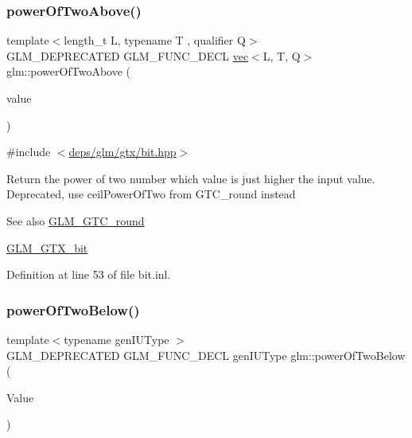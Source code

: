 \subsubsection{\texorpdfstring{power\+Of\+Two\+Above()}{powerOfTwoAbove()}\hspace{0.1cm}{\footnotesize\ttfamily [2/2]}}
{\footnotesize\ttfamily template$<$length\+\_\+t L, typename T , qualifier Q$>$ \\
G\+L\+M\+\_\+\+D\+E\+P\+R\+E\+C\+A\+T\+ED G\+L\+M\+\_\+\+F\+U\+N\+C\+\_\+\+D\+E\+CL \hyperlink{structglm_1_1vec}{vec}$<$L, T, Q$>$ glm\+::power\+Of\+Two\+Above (\begin{DoxyParamCaption}\item[{\hyperlink{structglm_1_1vec}{vec}$<$ L, T, Q $>$ const \&}]{value }\end{DoxyParamCaption})}



{\ttfamily \#include $<$\hyperlink{bit_8hpp}{deps/glm/gtx/bit.\+hpp}$>$}

Return the power of two number which value is just higher the input value. Deprecated, use ceil\+Power\+Of\+Two from G\+T\+C\+\_\+round instead

\begin{DoxySeeAlso}{See also}
\hyperlink{group__gtc__round}{G\+L\+M\+\_\+\+G\+T\+C\+\_\+round} 

\hyperlink{group__gtx__bit}{G\+L\+M\+\_\+\+G\+T\+X\+\_\+bit} 
\end{DoxySeeAlso}


Definition at line 53 of file bit.\+inl.

\mbox{\label{group__gtx__bit_ga3de7df63c589325101a2817a56f8e29d}} 
\subsubsection{\texorpdfstring{power\+Of\+Two\+Below()}{powerOfTwoBelow()}\hspace{0.1cm}{\footnotesize\ttfamily [1/2]}}
{\footnotesize\ttfamily template$<$typename gen\+I\+U\+Type $>$ \\
G\+L\+M\+\_\+\+D\+E\+P\+R\+E\+C\+A\+T\+ED G\+L\+M\+\_\+\+F\+U\+N\+C\+\_\+\+D\+E\+CL gen\+I\+U\+Type glm\+::power\+Of\+Two\+Below (\begin{DoxyParamCaption}\item[{gen\+I\+U\+Type}]{Value }\end{DoxyParamCaption})}



